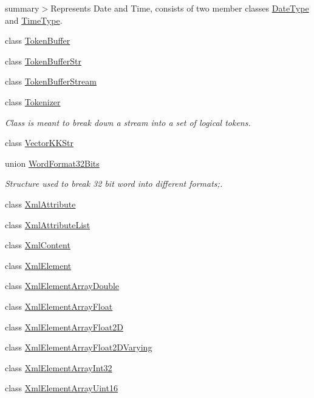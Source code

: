 \begin{DoxyCompactItemize}
\begin{DoxyCompactList}
summary$>$Represents Date and Time, consists of two member classes \hyperlink{class_k_k_b_1_1_date_type}{Date\+Type} and \hyperlink{class_k_k_b_1_1_time_type}{Time\+Type}.\end{DoxyCompactList}\item 
class \hyperlink{class_k_k_b_1_1_token_buffer}{Token\+Buffer}
\item 
class \hyperlink{class_k_k_b_1_1_token_buffer_str}{Token\+Buffer\+Str}
\item 
class \hyperlink{class_k_k_b_1_1_token_buffer_stream}{Token\+Buffer\+Stream}
\item 
class \hyperlink{class_k_k_b_1_1_tokenizer}{Tokenizer}
\begin{DoxyCompactList}\small\item\em Class is meant to break down a stream into a set of logical tokens. \end{DoxyCompactList}\item 
class \hyperlink{class_k_k_b_1_1_vector_k_k_str}{Vector\+K\+K\+Str}
\item 
union \hyperlink{union_k_k_b_1_1_word_format32_bits}{Word\+Format32\+Bits}
\begin{DoxyCompactList}\small\item\em Structure used to break 32 bit word into different formats;. \end{DoxyCompactList}\item 
class \hyperlink{class_k_k_b_1_1_xml_attribute}{Xml\+Attribute}
\item 
class \hyperlink{class_k_k_b_1_1_xml_attribute_list}{Xml\+Attribute\+List}
\item 
class \hyperlink{class_k_k_b_1_1_xml_content}{Xml\+Content}
\item 
class \hyperlink{class_k_k_b_1_1_xml_element}{Xml\+Element}
\item 
class \hyperlink{class_k_k_b_1_1_xml_element_array_double}{Xml\+Element\+Array\+Double}
\item 
class \hyperlink{class_k_k_b_1_1_xml_element_array_float}{Xml\+Element\+Array\+Float}
\item 
class \hyperlink{class_k_k_b_1_1_xml_element_array_float2_d}{Xml\+Element\+Array\+Float2D}
\item 
class \hyperlink{class_k_k_b_1_1_xml_element_array_float2_d_varying}{Xml\+Element\+Array\+Float2\+D\+Varying}
\item 
class \hyperlink{class_k_k_b_1_1_xml_element_array_int32}{Xml\+Element\+Array\+Int32}
\item 
class \hyperlink{class_k_k_b_1_1_xml_element_array_uint16}{Xml\+Element\+Array\+Uint16}

\end{DoxyCompactItemize}
